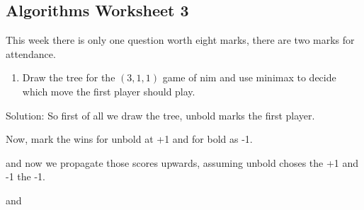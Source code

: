\documentclass[11pt,a4paper]{scrartcl}
\newif\ifanswers
\begin{document}
\subsection*{Algorithms Worksheet 3}

This week there is only one question worth eight marks, there are two
marks for attendance.

\begin{enumerate}

\item Draw the tree for the $(3,1,1)$ game of nim and use minimax to decide which move the first player should play.
\end{enumerate}

\ifanswers

\noindent Solution:
So first of all we draw the tree, unbold marks the first player.
\begin{center}
\end{center}
Now, mark the wins for unbold at +1 and for bold as -1.
\begin{center}
\end{center}
and now we propagate those scores upwards, assuming unbold choses the +1 and -1 the -1.
\begin{center}
\end{center}
and
\end{document}
